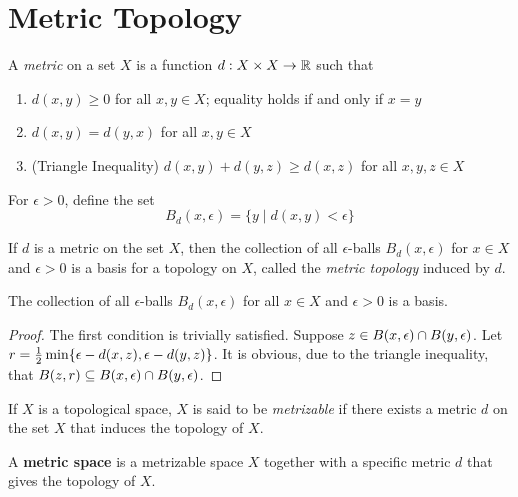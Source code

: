 \section{Metric Topology}
\begin{definition}[Metric]
    A \textit{metric} on a set $X$ is a function $d:X\times X\to\mathbb{R}$ such that 
    \begin{enumerate}
        \item $d(x,y)\ge0$ for all $x,y\in X$; equality holds if and only if $x = y$
        \item $d(x, y) = d(y, x)$ for all $x,y\in X$ 
        \item (Triangle Inequality) $d(x, y) + d(y, z)\ge d(x, z)$ for all $x,y,z\in X$
    \end{enumerate}
\end{definition}

For $\epsilon > 0$, define the set 
\begin{equation*}
    B_d(x,\epsilon) = \{y\mid d(x,y) < \epsilon\}
\end{equation*}

\begin{definition}
    If $d$ is a metric on the set $X$, then the collection of all $\epsilon$-balls $B_d(x,\epsilon)$ for $x\in X$ and $\epsilon > 0$ is a basis for a topology on $X$, called the \textit{metric topology} induced by $d$.
\end{definition}

\begin{proposition}
    The collection of all $\epsilon$-balls $B_d(x,\epsilon)$ for all $x\in X$ and $\epsilon > 0$ is a basis.
\end{proposition}
\begin{proof}
    The first condition is trivially satisfied. Suppose $z\in B(x,\epsilon)\cap B(y,\epsilon)$. Let $r = \frac{1}{2}\min\{\epsilon - d(x,z), \epsilon - d(y,z)\}$. It is obvious, due to the triangle inequality, that $B(z,r)\subseteq B(x,\epsilon)\cap B(y,\epsilon)$.
\end{proof}

\begin{definition}[Metrizable]
    If $X$ is a topological space, $X$ is said to be \textit{metrizable} if there exists a metric $d$ on the set $X$ that induces the topology of $X$.
\end{definition}

A \textbf{metric space} is a metrizable space $X$ together with a specific metric $d$ that gives the topology of $X$.

